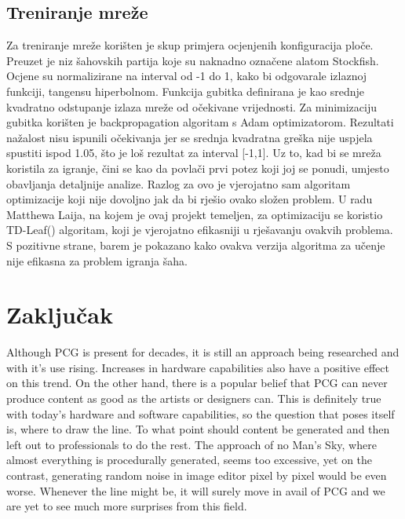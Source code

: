 \documentclass[journal]{IEEEtran}
\begin{document}
\subsection{Treniranje mreže}
Za treniranje mreže korišten je skup primjera ocjenjenih konfiguracija ploče. Preuzet je niz šahovskih partija koje su naknadno označene alatom Stockfish. Ocjene su normalizirane na interval od -1 do 1, kako bi odgovarale izlaznoj funkciji, tangensu hiperbolnom. Funkcija gubitka definirana je kao srednje kvadratno odstupanje izlaza mreže od očekivane vrijednosti. Za minimizaciju gubitka korišten je backpropagation algoritam s Adam optimizatorom. Rezultati nažalost nisu ispunili očekivanja jer se srednja kvadratna greška nije uspjela spustiti ispod 1.05, što je loš rezultat za interval [-1,1]. Uz to, kad bi se mreža koristila za igranje, čini se kao da povlači prvi potez koji joj se ponudi, umjesto obavljanja detaljnije analize. Razlog za ovo je vjerojatno sam algoritam optimizacije koji nije dovoljno jak da bi rješio ovako složen problem. U radu Matthewa Laija, na kojem je ovaj projekt temeljen, za optimizaciju se koristio TD-Leaf(\lambda) algoritam, koji je vjerojatno efikasniji u rješavanju ovakvih problema. S pozitivne strane, barem je pokazano kako ovakva verzija algoritma za učenje nije efikasna za problem igranja šaha.


\section{Zaključak}
Although PCG is present for decades, it is still an approach being researched and with it's use rising. Increases in hardware capabilities also have a positive effect on this trend. On the other hand, there is a popular belief that PCG can never produce content as good as the artists or designers can. This is definitely true with today's hardware and software capabilities, so the question that poses itself is, where to draw the line. To what point should content be generated and then left out to professionals to do the rest. The approach of no Man's Sky, where almost everything is procedurally generated, seems too excessive, yet on the contrast, generating random noise in image editor pixel by pixel would be even worse. Whenever the line might be, it will surely move in avail of PCG and we are yet to see much more surprises from this field.

\ifCLASSOPTIONcaptionsoff
  \newpage
\fi



\end{document}
